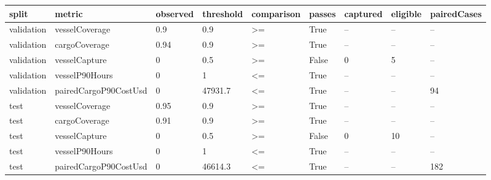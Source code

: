 \begin{tabular}{lllllllll}
\toprule
split & metric & observed & threshold & comparison & passes & captured & eligible & pairedCases \\
\midrule
validation & vesselCoverage & 0.9 & 0.9 & >= & True & -- & -- & -- \\
validation & cargoCoverage & 0.94 & 0.9 & >= & True & -- & -- & -- \\
validation & vesselCapture & 0 & 0.5 & >= & False & 0 & 5 & -- \\
validation & vesselP90Hours & 0 & 1 & <= & True & -- & -- & -- \\
validation & pairedCargoP90CostUsd & 0 & 47931.7 & <= & True & -- & -- & 94 \\
test & vesselCoverage & 0.95 & 0.9 & >= & True & -- & -- & -- \\
test & cargoCoverage & 0.91 & 0.9 & >= & True & -- & -- & -- \\
test & vesselCapture & 0 & 0.5 & >= & False & 0 & 10 & -- \\
test & vesselP90Hours & 0 & 1 & <= & True & -- & -- & -- \\
test & pairedCargoP90CostUsd & 0 & 46614.3 & <= & True & -- & -- & 182 \\
\bottomrule
\end{tabular}
